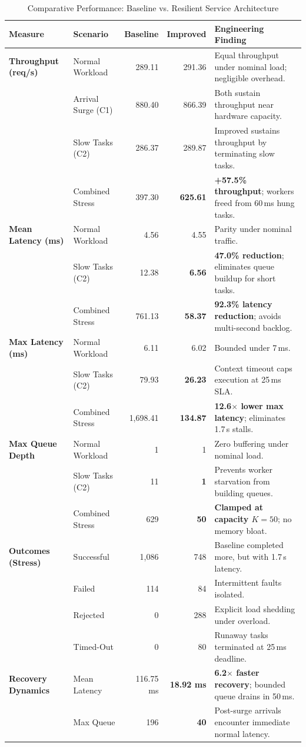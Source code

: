 \documentclass[11pt]{article}
\begin{document}
\begin{table}[ht]
\centering
\caption{Comparative Performance: Baseline vs. Resilient Service Architecture}
\label{tab:comparative_results}
\scriptsize
\begin{tabularx}{\textwidth}{l >{\raggedright\arraybackslash}p{2.3cm} r r >{\raggedright\arraybackslash}X}
\toprule
\textbf{Measure} & \textbf{Scenario} & \textbf{Baseline} & \textbf{Improved} & \textbf{Engineering Finding} \\
\midrule
\textbf{Throughput (req/s)} & Normal Workload & 289.11 & 291.36 & Equal throughput under nominal load; negligible overhead. \\
 & Arrival Surge (C1) & 880.40 & 866.39 & Both sustain throughput near hardware capacity. \\
 & Slow Tasks (C2) & 286.37 & 289.87 & Improved sustains throughput by terminating slow tasks. \\
 & Combined Stress & 397.30 & \textbf{625.61} & \textbf{+57.5\% throughput}; workers freed from 60\,ms hung tasks. \\
\midrule
\textbf{Mean Latency (ms)} & Normal Workload & 4.56 & 4.55 & Parity under nominal traffic. \\
 & Slow Tasks (C2) & 12.38 & \textbf{6.56} & \textbf{47.0\% reduction}; eliminates queue buildup for short tasks. \\
 & Combined Stress & 761.13 & \textbf{58.37} & \textbf{92.3\% latency reduction}; avoids multi-second backlog. \\
\midrule
\textbf{Max Latency (ms)} & Normal Workload & 6.11 & 6.02 & Bounded under 7\,ms. \\
 & Slow Tasks (C2) & 79.93 & \textbf{26.23} & Context timeout caps execution at 25\,ms SLA. \\
 & Combined Stress & 1,698.41 & \textbf{134.87} & \textbf{12.6$\times$ lower max latency}; eliminates 1.7\,s stalls. \\
\midrule
\textbf{Max Queue Depth} & Normal Workload & 1 & 1 & Zero buffering under nominal load. \\
 & Slow Tasks (C2) & 11 & \textbf{1} & Prevents worker starvation from building queues. \\
 & Combined Stress & 629 & \textbf{50} & \textbf{Clamped at capacity $K=50$}; no memory bloat. \\
\midrule
\textbf{Outcomes (Stress)} & Successful & 1,086 & 748 & Baseline completed more, but with 1.7\,s latency. \\
 & Failed & 114 & 84 & Intermittent faults isolated. \\
 & Rejected & 0 & 288 & Explicit load shedding under overload. \\
 & Timed-Out & 0 & 80 & Runaway tasks terminated at 25\,ms deadline. \\
\midrule
\textbf{Recovery Dynamics} & Mean Latency & 116.75 ms & \textbf{18.92 ms} & \textbf{6.2$\times$ faster recovery}; bounded queue drains in 50\,ms. \\
 & Max Queue & 196 & \textbf{40} & Post-surge arrivals encounter immediate normal latency. \\
\bottomrule
\end{tabularx}
\end{table}
\end{document}
